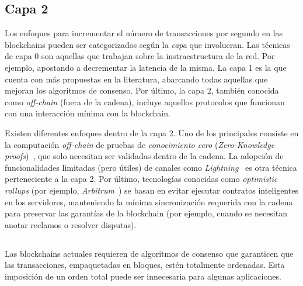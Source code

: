 

\subsection{Capa 2}
Los enfoques para incrementar el número de transacciones por segundo en las blockchains pueden
ser categorizados según la \emph{capa} que involucran.
%
Las técnicas de capa 0 son aquellas que trabajan sobre la instraestructura de la red.
%
Por ejemplo, apostando a decrementar la latencia de la misma.
% 
La capa 1 es la que cuenta con más propuestas en la literatura, abarcando todas aquellas que
mejoran los algoritmos de consenso.
%
Por último, la capa 2, también conocida como \emph{off-chain} (fuera de la cadena),
incluye aquellos protocolos que funcionan con una interacción mínima con la
blockchain\cite{Jourenko2019SoKAT}.

Existen diferentes enfoques dentro de la capa 2.
%
Uno de los principales consiste en la computación \emph{off-chain} de pruebas de \emph{conocimiento cero}
(\emph{Zero-Knowledge proofs})~\cite{Sasson2014ZKvonNeumann}, que solo necesitan ser validadas dentro de la cadena.
%
La adopción de funcionalidades limitadas (pero útiles) de canales como \emph{Lightning}~\cite{Poon2016lightning}
es otra técnica perteneciente a la capa 2.
%
Por último, tecnologías conocidas como \emph{optimistic rollups} (por ejemplo, \emph{Arbitrum}~\cite{Kalodner2018Arbitrum})
se basan en evitar ejecutar contratos inteligentes
en los servidores, manteniendo la mínima sincronización requerida con la cadena para preservar las garantías
de la blockchain (por ejemplo, cuando se necesitan anotar reclamos o resolver disputas).

\subsection{\setchain}
Las blockchains actuales requieren de algoritmos de consenso que garanticen que las
transacciones, empaquetadas en bloques, estén totalmente ordenadas.
%
Esta imposición de un orden total puede ser innecesaria para algunas aplicaciones.

